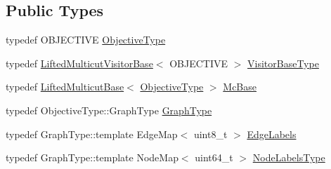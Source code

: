 \subsection*{Public Types}
\begin{DoxyCompactItemize}
\item 
typedef O\+B\+J\+E\+C\+T\+I\+VE \hyperlink{classnifty_1_1graph_1_1opt_1_1lifted__multicut_1_1PyLiftedMulticutBase_a2e2f37a21bb3b5e986e130287bcdeede}{Objective\+Type}
\item 
typedef \hyperlink{namespacenifty_1_1graph_1_1opt_1_1lifted__multicut_a3350124f8869505fecf39d697b9b2718}{Lifted\+Multicut\+Visitor\+Base}$<$ O\+B\+J\+E\+C\+T\+I\+VE $>$ \hyperlink{classnifty_1_1graph_1_1opt_1_1lifted__multicut_1_1PyLiftedMulticutBase_ac5e5eff52536f20200ad9004bea80998}{Visitor\+Base\+Type}
\item 
typedef \hyperlink{classnifty_1_1graph_1_1opt_1_1lifted__multicut_1_1LiftedMulticutBase}{Lifted\+Multicut\+Base}$<$ \hyperlink{classnifty_1_1graph_1_1opt_1_1lifted__multicut_1_1PyLiftedMulticutBase_a2e2f37a21bb3b5e986e130287bcdeede}{Objective\+Type} $>$ \hyperlink{classnifty_1_1graph_1_1opt_1_1lifted__multicut_1_1PyLiftedMulticutBase_aac831c9dae03c2f6e60a14d927a14627}{Mc\+Base}
\item 
typedef Objective\+Type\+::\+Graph\+Type \hyperlink{classnifty_1_1graph_1_1opt_1_1lifted__multicut_1_1PyLiftedMulticutBase_a3b06c0de042d21b98ad3503fa7a6b000}{Graph\+Type}
\item 
typedef Graph\+Type\+::template Edge\+Map$<$ uint8\+\_\+t $>$ \hyperlink{classnifty_1_1graph_1_1opt_1_1lifted__multicut_1_1PyLiftedMulticutBase_a5e4bcacb959f6be14e4544b8ae228deb}{Edge\+Labels}
\item 
typedef Graph\+Type\+::template Node\+Map$<$ uint64\+\_\+t $>$ \hyperlink{classnifty_1_1graph_1_1opt_1_1lifted__multicut_1_1PyLiftedMulticutBase_afeaa6139205af7449872174c68de2b57}{Node\+Labels\+Type}
\end{DoxyCompactItemize}
